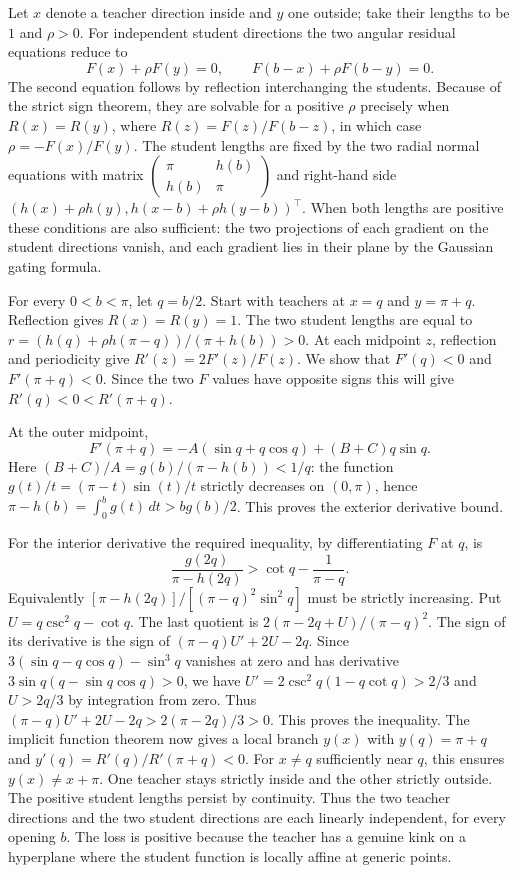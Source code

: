\documentclass[11pt]{article}
\begin{document}
Let $x$ denote a teacher direction inside and $y$ one outside; take their lengths to be $1$ and $\rho>0$. For independent student directions the two angular residual equations reduce to
\[
 F(x)+\rho F(y)=0,\qquad F(b-x)+\rho F(b-y)=0 .
\]
The second equation follows by reflection interchanging the students. Because of the strict sign theorem, they are solvable for a positive $\rho$ precisely when $R(x)=R(y)$, where $R(z)=F(z)/F(b-z)$, in which case $\rho=-F(x)/F(y)$. The student lengths are fixed by the two radial normal equations with matrix $\left(\begin{smallmatrix}\pi&h(b)\\h(b)&\pi\end{smallmatrix}\right)$ and right-hand side $(h(x)+\rho h(y),h(x-b)+\rho h(y-b))^\top$. When both lengths are positive these conditions are also sufficient: the two projections of each gradient on the student directions vanish, and each gradient lies in their plane by the Gaussian gating formula.

For every $0<b<\pi$, let $q=b/2$. Start with teachers at $x=q$ and $y=\pi+q$. Reflection gives $R(x)=R(y)=1$. The two student lengths are equal to $r=(h(q)+\rho h(\pi-q))/(\pi+h(b))>0$. At each midpoint $z$, reflection and periodicity give $R'(z)=2F'(z)/F(z)$. We show that $F'(q)<0$ and $F'(\pi+q)<0$. Since the two $F$ values have opposite signs this will give $R'(q)<0<R'(\pi+q)$.

At the outer midpoint,
\[
 F'(\pi+q)=-A(\sin q+q\cos q)+(B+C)q\sin q.
\]
Here $(B+C)/A=g(b)/(\pi-h(b))<1/q$: the function $g(t)/t=(\pi-t)\sin(t)/t$ strictly decreases on $(0,\pi)$, hence $\pi-h(b)=\int_0^b g(t)\,dt>b g(b)/2$. This proves the exterior derivative bound.

For the interior derivative the required inequality, by differentiating $F$ at $q$, is
\[
 \frac{g(2q)}{\pi-h(2q)}>\cot q-\frac1{\pi-q}.
\]
Equivalently $[\pi-h(2q)]/[(\pi-q)^2\sin^2 q]$ must be strictly increasing. Put $U=q\csc^2q-\cot q$. The last quotient is $2(\pi-2q+U)/(\pi-q)^2$. The sign of its derivative is the sign of $(\pi-q)U'+2U-2q$. Since $3(\sin q-q\cos q)-\sin^3q$ vanishes at zero and has derivative $3\sin q(q-\sin q\cos q)>0$, we have $U'=2\csc^2q(1-q\cot q)>2/3$ and $U>2q/3$ by integration from zero. Thus $(\pi-q)U'+2U-2q>2(\pi-2q)/3>0$. This proves the inequality. The implicit function theorem now gives a local branch $y(x)$ with $y(q)=\pi+q$ and $y'(q)=R'(q)/R'(\pi+q)<0$. For $x\ne q$ sufficiently near $q$, this ensures $y(x)\ne x+\pi$. One teacher stays strictly inside and the other strictly outside. The positive student lengths persist by continuity. Thus the two teacher directions and the two student directions are each linearly independent, for every opening $b$. The loss is positive because the teacher has a genuine kink on a hyperplane where the student function is locally affine at generic points.
\end{document}
